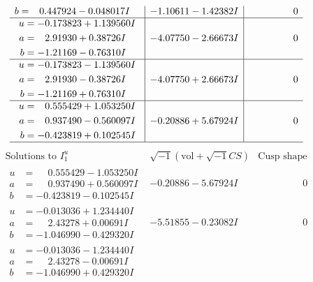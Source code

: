 \documentclass[1p]{elsarticle_modified}
\theoremstyle{definition}
\newcommand{\I}{\sqrt{-1}}
\begin{document}
$$\begin{array}{c|c|c}
\begin{aligned}
b &= \phantom{-}0.447924 - 0.048017 I\end{aligned}
 & -1.10611 - 1.42382 I & \phantom{-0.000000 } 0 \\ \hline\begin{aligned}
u &= -0.173823 + 1.139560 I \\
a &= \phantom{-}2.91930 + 0.38726 I \\
b &= -1.21169 - 0.76310 I\end{aligned}
 & -4.07750 - 2.66673 I & \phantom{-0.000000 } 0 \\ \hline\begin{aligned}
u &= -0.173823 - 1.139560 I \\
a &= \phantom{-}2.91930 - 0.38726 I \\
b &= -1.21169 + 0.76310 I\end{aligned}
 & -4.07750 + 2.66673 I & \phantom{-0.000000 } 0 \\ \hline\begin{aligned}
u &= \phantom{-}0.555429 + 1.053250 I \\
a &= \phantom{-}0.937490 - 0.560097 I \\
b &= -0.423819 + 0.102545 I\end{aligned}
 & -0.20886 + 5.67924 I & \phantom{-0.000000 } 0\\
 \hline 
 \end{array}$$\newpage$$\begin{array}{c|c|c}  
\text{Solutions to }I^u_{1}& \I (\text{vol} + \sqrt{-1}CS) & \text{Cusp shape}\\
 \hline 
\begin{aligned}
u &= \phantom{-}0.555429 - 1.053250 I \\
a &= \phantom{-}0.937490 + 0.560097 I \\
b &= -0.423819 - 0.102545 I\end{aligned}
 & -0.20886 - 5.67924 I & \phantom{-0.000000 } 0 \\ \hline\begin{aligned}
u &= -0.013036 + 1.234440 I \\
a &= \phantom{-}2.43278 + 0.00691 I \\
b &= -1.046990 - 0.429320 I\end{aligned}
 & -5.51855 - 0.23082 I & \phantom{-0.000000 } 0 \\ \hline\begin{aligned}
u &= -0.013036 - 1.234440 I \\
a &= \phantom{-}2.43278 - 0.00691 I \\
b &= -1.046990 + 0.429320 I\end{aligned}

\end{array}$$
\end{document}
